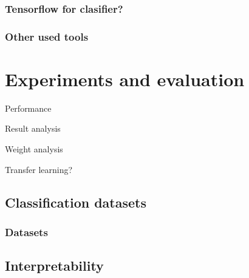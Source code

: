         \subsection{Tensorflow for clasifier?}
        \* %
        \* %
        \* %
    
        \subsection{Other used tools}
        \cite{perez2007ipython} %
        \* %
        \* %
        \cite{hunter2007matplotlib} %
        \cite{mckinney2010data}
        
        
        

\chapter{Experiments and evaluation}

    Performance
    
    Result analysis
    
    Weight analysis
    
    Transfer learning?

    \section{Classification datasets}
        \subsection{Datasets}
            \cite{conneau2017supervised} %

    \section{Interpretability}
        \cite{ribeiro2016should} %


